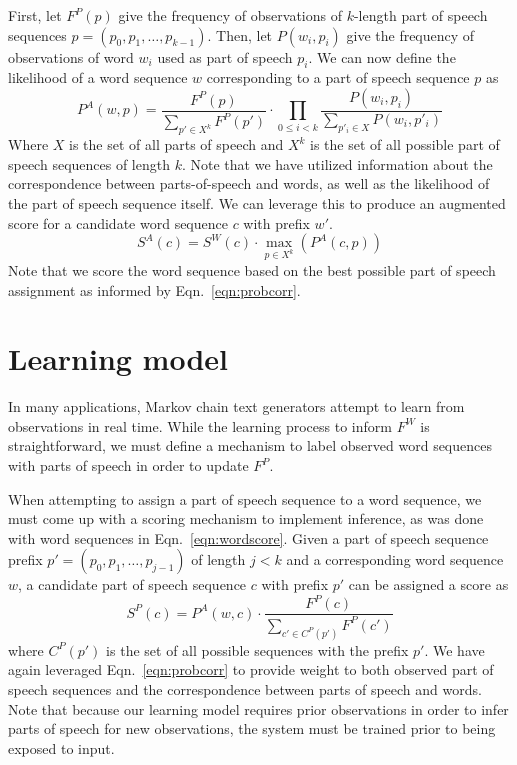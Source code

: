 \documentclass[11pt]{article}
\begin{document}
First, let $F^P(p)$ give the frequency of observations of $k$-length part of speech sequences
$p = (p_0, p_1, \dots, {p_{k-1}})$.
%
Then, let $P(w_i, p_i)$ give the frequency of observations of word $w_i$ used as
part of speech $p_i$.
%
We can now define the likelihood of a word sequence $w$ corresponding to a part of speech
sequence $p$ as
%
\begin{equation}
\label{eqn:probcorr}
P^A(w, p) =  \frac{F^P(p)}{\sum_{p' \in X^k} F^P(p')} \cdot \prod_{0 \leq i < k} \frac{P(w_i, p_i)}{\sum_{p'_i \in X} P(w_i, p'_i) }
\end{equation}
%
Where $X$ is the set of all parts of speech and $X^k$ is the set of all possible part of speech
sequences of length $k$.
%
Note that we have utilized information about the correspondence between parts-of-speech
and words, as well as the likelihood of the part of speech sequence itself.
%
We can leverage this to produce an augmented score for a candidate word sequence $c$
with prefix $w'$.
%
\begin{equation}
\label{eqn:augscore}
S^A(c) = S^W(c) \cdot \max_{p \in X^k} \left( P^A(c, p) \right)
\end{equation}
%
Note that we score the word sequence based on the best possible part of speech assignment
as informed by Eqn.~\ref{eqn:probcorr}.
%

\section{Learning model}

In many applications, Markov chain text generators attempt to learn from observations in
real time.
%
While the learning process to inform $F^W$ is straightforward, we must define a mechanism
to label observed word sequences with parts of speech in order to update $F^P$.

When attempting to assign a part of speech sequence to a word sequence, we must come up with
a scoring mechanism to implement inference, as was done with word sequences in
Eqn.~\ref{eqn:wordscore}.
%
Given a part of speech sequence prefix $p' = (p_0, p_1, \dots, p_{j-1})$ of length $j < k$
and a corresponding word sequence $w$, a candidate part of speech sequence $c$ with prefix $p'$
can be assigned a score as 
%
\begin{equation}
\label{eqn:posscore}
S^P(c) = P^A(w, c) \cdot \frac{F^P(c)}{\sum_{c' \in C^P(p')} F^P(c')}
\end{equation}
%
where $C^P(p')$ is the set of all possible sequences with the prefix $p'$.
%
We have again leveraged Eqn.~\ref{eqn:probcorr} to provide weight to both observed
part of speech sequences and the correspondence between parts of speech and words.
%
Note that because our learning model requires prior observations in order to infer
parts of speech for new observations, the system must be trained prior to being
exposed to input.
%
\end{document}
